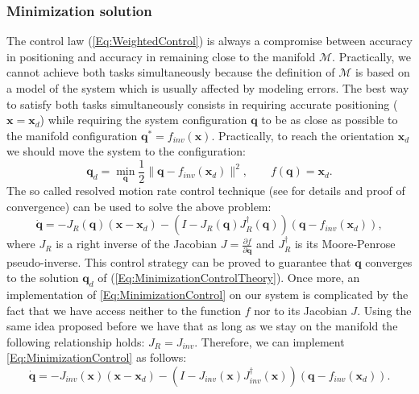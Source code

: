 \documentclass[conference]{IEEEtran}
\numberwithin{equation}{section}
\newcommand{\q}{\mathbf{q}}
\newcommand{\x}{\mathbf{x}}
\begin{document}
\subsubsection{Minimization solution} \label{Sec:MinimizationSolution}

The control law (\ref{Eq:WeightedControl}) is always a compromise between accuracy in positioning and accuracy in remaining close to the manifold $\mathcal M$. Practically, we cannot achieve both tasks simultaneously because the definition of $\mathcal M$ is based on a model of the system which is usually affected by modeling errors. The best way to satisfy both tasks simultaneously consists in requiring accurate positioning ($\x=\x_d$) while requiring the system configuration $\q$ to be as close as possible to the manifold configuration $\q^* = f_{inv}(\x)$. Practically, to reach the orientation $\x_d$ we should move the system to the configuration:
\begin{equation} \label{Eq:MinimizationControlTheory}
\q_d = \min_{\q} \frac{1}{2}\| \q - f_{inv}(\x_d)\|^2, \qquad f(\q) = \x_d.
\end{equation}
The so called resolved motion rate control technique (see \cite{SamsonEspiau} for details and proof of convergence) can be used to solve the above problem:
\begin{equation} \label{Eq:MinimizationControl}
\dot{\q} = -J_R(\q) (\x-\x_d) - \left(I-J_R(\q) J_R^\dagger(\q)\right) \left(\q - f_{inv}(\x_d)\right),
\end{equation}
where $J_R$ is a right inverse of the Jacobian $J = \frac{\partial f}{\partial \q}$ and $J_R^\dagger$ is its Moore-Penrose pseudo-inverse. This control strategy can be proved to guarantee that $\q$ converges to the solution $\q_d$ of (\ref{Eq:MinimizationControlTheory}). Once more, an implementation of \eqref{Eq:MinimizationControl} on our system is complicated by the fact that we have access neither to the function $f$ nor to its Jacobian $J$. Using the same idea proposed before we have that as long as we stay on the manifold the following relationship holds: $J_R = J_{inv}$. Therefore, we can implement \eqref{Eq:MinimizationControl} as follows:
\begin{equation} \label{Eq:MinimizationControl2}
\dot{\q} = -J_{inv}(\x) (\x-\x_d) - \left(I-J_{inv}(\x) J_{inv}^\dagger(\x)\right) \left(\q - f_{inv}(\x_d)\right).
\end{equation}
\end{document}
